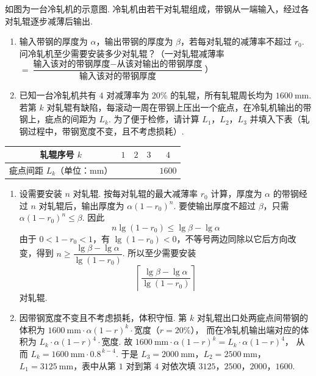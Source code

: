 \documentclass[UTF8,a4paper,oneside,11pt]{ctexbook}
\begin{document}
\begin{problem}
如图为一台冷轧机的示意图. 冷轧机由若干对轧辊组成，带钢从一端输入，经过各对轧辊逐步减薄后输出.

\begin{enumerate}
\item 输入带钢的厚度为 \(\alpha\)，输出带钢的厚度为 \(\beta\)，若每对轧辊的减薄率不超过 \(r_0\). 问冷轧机至少需要安装多少对轧辊？（一对轧辊减薄率 \(=\dfrac{\text{输入该对的带钢厚度}-\text{从该对输出的带钢厚度}}{\text{输入该对的带钢厚度}}\)）
\item 已知一台冷轧机共有 \(4\) 对减薄率为 \(20\%\) 的轧辊，所有轧辊周长均为 \(1600\mathrm{~mm}\). 若第 \(k\) 对轧辊有缺陷，每滚动一周在带钢上压出一个疵点，在冷轧机输出的带钢上，疵点的间距为 \(L_k\). 为了便于检修，请计算 \(L_1\)，\(L_2\)，\(L_3\) 并填入下表（轧钢过程中，带钢宽度不变，且不考虑损耗）.
\end{enumerate}

\begin{center}
\begin{tabular}{|c|c|c|c|c|}
\hline
轧辊序号 \(k\) & \(1\) & \(2\) & \(3\) & \(4\) \\
\hline
疵点间距 \(L_k\)（单位：\(\mathrm{mm}\)） &\fillinblank{} &\fillinblank{} &\fillinblank{} & \(1600\) \\
\hline
\end{tabular}
\end{center}

\end{problem}

\begin{solution}
\begin{enumerate}
\item 设需要安装 \(n\) 对轧辊. 按每对轧辊的最大减薄率 \(r_0\) 计算，厚度为 \(\alpha\) 的带钢经过 \(n\) 对轧辊后，输出厚度为 \(\alpha(1-r_0)^n\). 要使输出厚度不超过 \(\beta\)，只需 \(\alpha(1-r_0)^n\le \beta\).
因此
\[
n\lg(1-r_0)\le\lg\beta-\lg\alpha
\]
由于 \(0<1-r_0<1\)，有 \(\lg(1-r_0)<0\)，不等号两边同除以它后方向改变，得到
\(n\ge \dfrac{\lg\beta-\lg\alpha}{\lg(1-r_0)}\). 所以至少需要安装
\[
\left\lceil\frac{\lg\beta-\lg\alpha}{\lg(1-r_0)}\right\rceil
\]
对轧辊.

\item 因带钢宽度不变且不考虑损耗，体积守恒. 第 \(k\) 对轧辊出口处两疵点间带钢的体积为 \(1600\mathrm{~mm}\cdot \alpha(1-r)^k\cdot \text{宽度}\)（\(r=20\%\)），
而在冷轧机输出端对应的体积为 \(L_k\cdot \alpha(1-r)^4\cdot \text{宽度}\).
故 \(1600\mathrm{~mm}\cdot \alpha(1-r)^k=L_k\cdot \alpha(1-r)^4\)，
从而 \(L_k=1600\mathrm{~mm}\cdot 0.8^{\,k-4}\).
于是 \(L_3=2000\mathrm{~mm}\)，\(L_2=2500\mathrm{~mm}\)，\(L_1=3125\mathrm{~mm}\)，表中从第 \(1\) 对到第 \(4\) 对依次填 \(3125\)，\(2500\)，\(2000\)，\(1600\).
\end{enumerate}
\end{solution}
\end{document}
